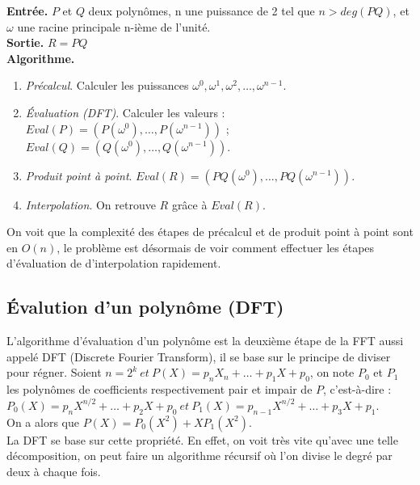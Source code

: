 \documentclass[12pt, a4paper]{article}
\begin{document}
\begin{tcolorbox}[colback=cyan!5!white,
                  colframe=cyan!100!black,
                  title=\textbf{Algorithme de multiplication par la FFT (METTRE SOURCES)}
                 ]
\textbf{Entrée.} $P$ et $Q$ deux polynômes, n une puissance de 2 tel que $n>deg(PQ)$, et $\omega$ une racine principale n-ième de l’unité. \\
\textbf{Sortie.} $R = PQ$ \\
\textbf{Algorithme.}
\begin{enumerate}[itemsep=-2ex]
\item\textit{Précalcul}. Calculer les puissances $\omega^0,\omega^1,\omega^2,\dots,\omega^{n-1}$. \\
\item\textit{Évaluation (DFT)}. Calculer les valeurs : \\ $Eval(P)=(P(\omega^0),\dots,P(\omega^{n-1}))$ ; $Eval(Q)=(Q(\omega^0),\dots,Q(\omega^{n-1}))$. \\
\item\textit{Produit point à point}. $Eval(R) = (PQ(\omega^0),\dots,PQ(\omega^{n-1}))$. \\
\item\textit{Interpolation}. On retrouve $R$ grâce à $Eval(R)$.
\end{enumerate}
\end{tcolorbox}
On voit que la complexité des étapes de précalcul et de produit point à point sont en $O(n)$, le problème est désormais de voir comment effectuer les étapes d'évaluation de d'interpolation rapidement.

\subsection{Évalution d'un polynôme (DFT)}

L'algorithme d'évaluation d'un polynôme est la deuxième étape de la FFT aussi appelé DFT (Discrete Fourier Transform), il se base sur le principe de diviser pour régner.
Soient $n = 2^k\ et\ P(X) = p_n X_n +\dots+p_1 X + p_0$, on note $P_0$ et $P_1$ les polynômes de coefficients respectivement pair et impair de $P$, c'est-à-dire : \\
$P_0(X) = p_{n} X^{n/2} +\dots+ p_2 X + p_0\ et\ P_1(X) = p_{n-1} X^{n/2} +\dots+ p_3 X + p_1$. \\
On a alors que $P(X) = P_0(X^2)+X P_1(X^2)$. \\
La DFT se base sur cette propriété. En effet, on voit très vite qu'avec une telle décomposition, on peut faire un algorithme récursif où l'on divise le degré par deux à chaque fois.
\end{document}
